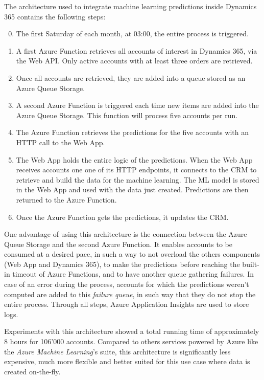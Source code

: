 The architecture used to integrate machine learning predictions inside Dynamics 365 contains the following steps:
\vspace*{-\baselineskip}
\begin{enumerate}[label=\texttt{\arabic*.}]
    \setcounter{enumi}{-1}
    \item The first Saturday of each month, at 03:00, the entire process is triggered.
    \item A first Azure Function retrieves all accounts of interest in Dynamics 365, via the Web API. Only active accounts with at least three orders are retrieved.
    \item Once all accounts are retrieved, they are added into a queue stored as an Azure Queue Storage.
    \item A second Azure Function is triggered each time new items are added into the Azure Queue Storage. This function will process five accounts per run.
    \item The Azure Function retrieves the predictions for the five accounts with an HTTP call to the Web App.
    \item The Web App holds the entire logic of the predictions. When the Web App receives accounts one one of its HTTP endpoints, it connects to the CRM to retrieve and build the data for the machine learning. The ML model is stored in the Web App and used with the data just created. Predictions are then returned to the Azure Function.
    \item Once the Azure Function gets the predictions, it updates the CRM.
\end{enumerate}

One advantage of using this architecture is the connection between the Azure Queue Storage and the second Azure Function. It enables accounts to be consumed at a desired pace, in such a way to not overload the others components (Web App and Dynamics 365), to make the predictions before reaching the built-in timeout of Azure Functions, and to have another queue gathering failures. In case of an error during the process, accounts for which the predictions weren't computed are added to this \textit{failure queue}, in such way that they do not stop the entire process. Through all steps, Azure Application Insights are used to store logs.

Experiments with this architecture showed a total running time of approximately 8 hours for 106'000 accounts. Compared to others services powered by Azure like the \textit{Azure Machine Learning}'s suite, this architecture is significantly less expensive, much more flexible and better suited for this use case where data is created on-the-fly.


